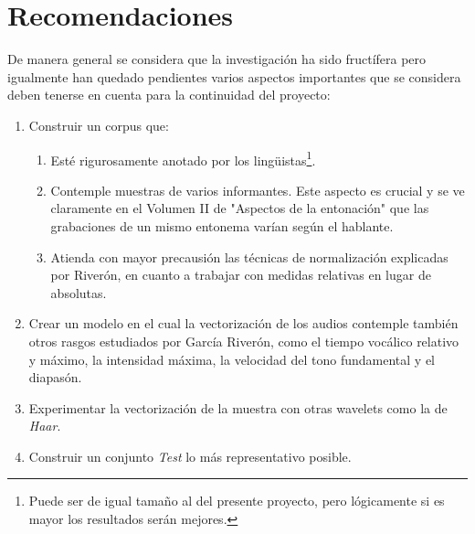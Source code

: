 \chapter*{Recomendaciones}\label{chapter:recomendaciones}

De manera general se considera que la investigaci\'on ha sido fruct\'ifera pero igualmente han  quedado pendientes varios aspectos importantes que se considera deben tenerse en cuenta para la continuidad del proyecto:
\begin{enumerate}
\item Construir un corpus que: 
\begin{enumerate}
\item Est\'e rigurosamente anotado por los ling\"uistas\footnote{Puede ser de igual tama\~no al del presente proyecto, pero l\'ogicamente si es mayor los resultados ser\'an mejores.}.
\item Contemple muestras de varios informantes. Este aspecto es crucial y se ve claramente en el Volumen II de "{Aspectos de la entonaci\'on}" que las grabaciones de un mismo entonema var\'ian seg\'un el hablante.
\item Atienda con mayor precausi\'on las t\'ecnicas de normalizaci\'on explicadas por River\'on, en cuanto a trabajar con medidas relativas en lugar de absolutas. 
\end{enumerate} 
\item Crear un modelo en el cual la vectorizaci\'on de los audios contemple tambi\'en otros rasgos estudiados por Garc\'ia River\'on, como el tiempo voc\'alico relativo y m\'aximo, la intensidad m\'axima, la velocidad del tono fundamental y el diapas\'on.
\item Experimentar la vectorizaci\'on de la muestra con otras wavelets como la de \emph{Haar}\cite[secci\'on 3.2.5]{addison2017illustrated}.
\item Construir un conjunto \textit{Test} lo m\'as representativo posible.
\end{enumerate}